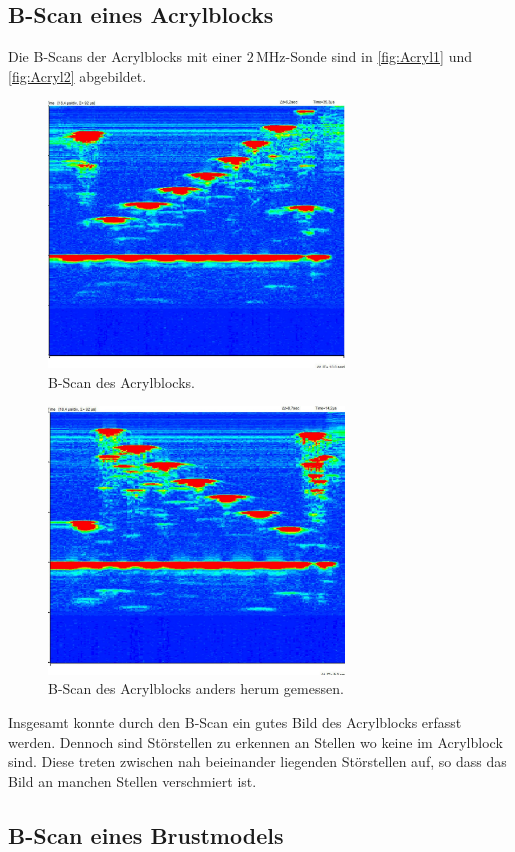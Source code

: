 \subsection{B-Scan eines Acrylblocks}
Die B-Scans der Acrylblocks mit einer $2\,\unit{\mega\hertz}$-Sonde sind in \autoref{fig:Acryl1} und
\autoref{fig:Acryl2} abgebildet.
\begin{figure}
  \centering
  \includegraphics[width=0.7\textwidth]{messwerte/BScanAcrylBlock/2Mhz.jpg}
  \caption{B-Scan des Acrylblocks.}
  \label{fig:Acryl1}
\end{figure}

\begin{figure}
  \centering
  \includegraphics[width=0.7\textwidth]{messwerte/BScanAcrylBlock/umgedreht.jpg}
  \caption{B-Scan des Acrylblocks anders herum gemessen.}
  \label{fig:Acryl2}
\end{figure}
Insgesamt konnte durch den B-Scan ein gutes Bild des Acrylblocks erfasst werden. Dennoch sind Störstellen
zu erkennen an Stellen wo keine im Acrylblock sind. Diese treten zwischen nah beieinander liegenden Störstellen
auf, so dass das Bild an manchen Stellen verschmiert ist.

\subsection{B-Scan eines Brustmodels}